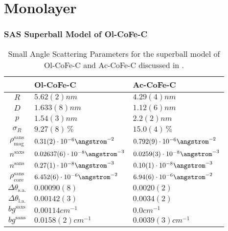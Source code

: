 \documentclass[\main/dresen_thesis.tex]{subfiles}
\begin{document}
\section{Monolayer}
\subsubsection{SAS Superball Model of Ol-CoFe-C}\label{ch:appendix:modelparameters:monolayers:sas_olac_cofe_c}
  \begin{table}[h]
    \centering
    \caption{\label{tab:appendix:modelparamters:monolayers:nanoparticle:sas}Small Angle Scattering Parameters for the superball model of Ol-CoFe-C and Ac-CoFe-C discussed in .}
    \begin{tabular}{ c | l | l }
        & Ol-CoFe-C & Ac-CoFe-C \\
      \hline
      $R$
        & $5.62(2) \unit{nm}$
        & $4.29(4) \unit{nm}$\\
      $D$
        & $1.633(8) \unit{nm}$
        & $1.12(6) \unit{nm}$\\
      $p$
        & $1.54(3) \unit{nm}$
        & $2.2(2) \unit{nm}$\\
      $\sigma_R$
        & $9.27(8) \,\%$
        & $15.0(4) \,\%$\\
      $\rho_\mathrm{mag}^\mathrm{sans}$
        & $0.31(2) \cdot 10^{-6} \angstrom^{-2}$
        & $0.792(9) \cdot 10^{-6} \angstrom^{-2}$\\
      \hline
      $n^\mathrm{saxs}$
        & $0.02637(6) \cdot 10^{-8} \angstrom^{-3}$
        & $0.0259(3) \cdot 10^{-8} \angstrom^{-3}$\\
      $n^\mathrm{sans}$
        & $0.27(1) \cdot 10^{-8} \angstrom^{-3}$
        & $0.10(1) \cdot 10^{-8} \angstrom^{-3}$\\
      $\rho_\mathrm{core}^\mathrm{sans}$
        & $6.452(6) \cdot 10^{-6} \angstrom^{-2}$
        & $6.94(6)  \cdot 10^{-6} \angstrom^{-2}$\\
      $\Delta \theta_\mathrm{s. a.}$
        & $0.00090(8)$
        & $0.0020(2)$\\
      $\Delta \theta_\mathrm{l. a.}$
        & $0.00142(3)$
        & $0.0034(2)$\\
      $bg^\mathrm{saxs}$
        & $0.00114 \unit{cm}^{-1}$
        & $0.0 \unit{cm}^{-1}$\\
      $bg^\mathrm{sans}$
        & $0.0158(2) \unit{cm}^{-1}$
        & $0.0039(3) \unit{cm}^{-1}$\\

\end{tabular}
\end{table}
\end{document}
